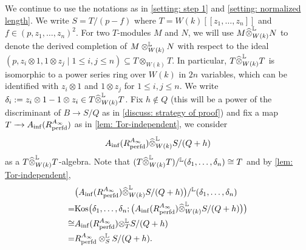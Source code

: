 \documentclass[12pt]{amsart}
\numberwithin{equation}{theorem}
\numberwithin{equation}{theorem}
\newcommand{\perfd}{\textnormal{perfd}}
\newcommand{\Kos}{\textnormal{Kos}}
\begin{document}
\begin{setting}
\label{setting: step 2}
We continue to use the notations as in \autoref{setting: step 1} and \autoref{setting: normalized length}. We write $S=T/(p-f)$ where $T= W(k)[[z_1,\dots,z_n]]$ and $f\in (p,z_1,\dots,z_n)^2$. For two $T$-modules $M$ and $N$, we will use $M\widehat{\otimes}_{W(k)}^{\mathbb{L}} N$ to denote the derived completion of $M\otimes_{W(k)}^{\mathbb{L}} N$ with respect to the ideal $(p, z_i\otimes 1, 1\otimes z_j \mid 1\leq i, j \leq n) \subseteq T\otimes_{W(k)}T$. In particular, $T\widehat{\otimes}_{W(k)}^{\mathbb{L}} T$ is isomorphic to a power series ring over $W(k)$ in $2n$ variables, which can be identified with $z_i\otimes 1$ and $1\otimes z_j$ for $1\leq i, j \leq n$. We write $\delta_i := z_i\otimes 1 - 1\otimes z_i \in T\widehat{\otimes}_{W(k)}^{\mathbb{L}} T$. Fix $h\notin Q$ (this will be a power of the discriminant of $B\to S/Q$ as in \autoref{discuss: strategy of proof}) and fix a map $T\to A_{\inf}(R^{A_\infty}_\perfd)$ as in \autoref{lem: Tor-independent}, we consider
$$A_{\inf}(R^{A_\infty}_\perfd) \widehat{\otimes}^\myL_{W(k)} S/(Q+h)$$
as a $T\widehat{\otimes}^{\mathbb{L}}_{W(k)} T$-algebra. Note that $(T\widehat{\otimes}^{\mathbb{L}}_{W(k)} T)/^{\mathbb{L}} (\delta_1,\dots,\delta_n) \cong T$ and by \autoref{lem: Tor-independent},
\begin{align}
\label{eqn: eqn in the last setup}
& \big(A_{\inf}(R^{A_\infty}_\perfd) \widehat{\otimes}^\myL_{W(k)} S/(Q+h)\big) /^{\myL}(\delta_1,\dots,\delta_n) \\
 = & \Kos\big(\delta_1,\dots,\delta_n; \big(A_{\inf}(R^{A_\infty}_\perfd) \widehat{\otimes}^\myL_{W(k)} S/(Q+h)\big) \big) \notag \\
 \cong & A_{\inf}(R^{A_\infty}_\perfd) {\otimes}^\myL_{T} S/(Q+h) \notag \\ 
 =  & R^{A_\infty}_\perfd \otimes^\myL_S S/(Q+h).    \notag
\end{align}
\end{setting}
\end{document}
